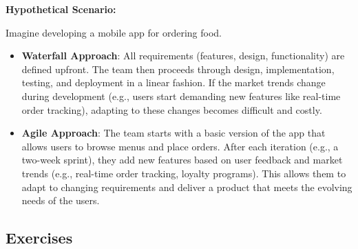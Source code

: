 
\textbf{Hypothetical Scenario:}

Imagine developing a mobile app for ordering food.

\begin{itemize}
  \item \textbf{Waterfall Approach}: All requirements (features, design, functionality) are defined upfront. The team then proceeds through design, implementation, testing, and deployment in a linear fashion. If the market trends change during development (e.g., users start demanding new features like real-time order tracking), adapting to these changes becomes difficult and costly.

  \item \textbf{Agile Approach}: The team starts with a basic version of the app that allows users to browse menus and place orders. After each iteration (e.g., a two-week sprint), they add new features based on user feedback and market trends (e.g., real-time order tracking, loyalty programs). This allows them to adapt to changing requirements and deliver a product that meets the evolving needs of the users.
\end{itemize}

\subsection{Exercises}

